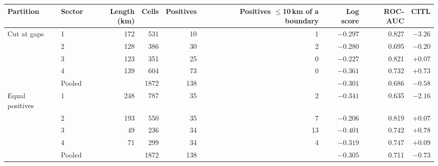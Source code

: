 \begin{tabular}{llrrrrrrr}
\toprule
Partition & Sector & Length (km) & Cells & Positives & Positives $\le$10\,km of a boundary & Log score & ROC-AUC & CITL \\
\midrule
Cut at gaps & 1 & 172 & 531 & 10 & 1 & $-0.297$ & 0.827 & $-3.26$ \\
 & 2 & 128 & 386 & 30 & 2 & $-0.280$ & 0.695 & $-0.20$ \\
 & 3 & 123 & 351 & 25 & 0 & $-0.227$ & 0.821 & $+0.07$ \\
 & 4 & 139 & 604 & 73 & 0 & $-0.361$ & 0.732 & $+0.73$ \\
 & Pooled & & 1872 & 138 & & $-0.301$ & 0.686 & $-0.58$ \\
\addlinespace
Equal positives & 1 & 248 & 787 & 35 & 2 & $-0.341$ & 0.635 & $-2.16$ \\
 & 2 & 193 & 550 & 35 & 7 & $-0.206$ & 0.819 & $+0.07$ \\
 & 3 & 49 & 236 & 34 & 13 & $-0.401$ & 0.742 & $+0.78$ \\
 & 4 & 71 & 299 & 34 & 4 & $-0.319$ & 0.747 & $+0.09$ \\
 & Pooled & & 1872 & 138 & & $-0.305$ & 0.711 & $-0.73$ \\
\bottomrule
\end{tabular}
